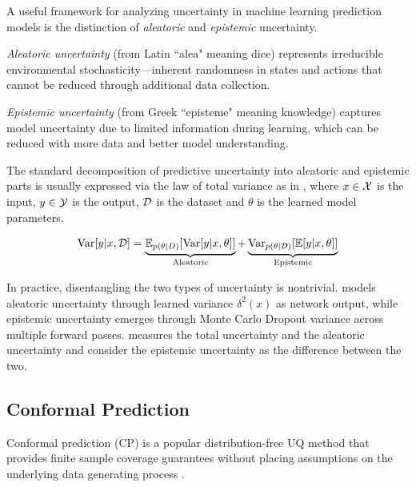 A useful framework for analyzing uncertainty in machine learning prediction models is the distinction of \textit{aleatoric} and \textit{epistemic} uncertainty.

\textit{Aleatoric uncertainty} (from Latin ``alea" meaning dice) represents irreducible environmental stochasticity—inherent randomness in states and actions that cannot be reduced through additional data collection.

\textit{Epistemic uncertainty} (from Greek ``episteme" meaning knowledge) captures model uncertainty due to limited information during learning, which can be reduced with more data and better model understanding.

The standard decomposition of predictive uncertainty into aleatoric and epistemic parts is usually expressed via the law of total variance as in  \cite{mackay2003information}, where $x\in {\mathcal{X}}$ is the input, $y\in {\mathcal{Y}}$ is the output, ${\mathcal{D}}$ is the dataset and $\theta$ is the learned model parameters.

\begin{equation}
\text{Var}[y|x, {\mathcal{D}}] = \underbrace{\mathbb{E}_{p(\theta|D)}[\text{Var}[y|x,\theta]]}_{\text{Aleatoric}} + \underbrace{\text{Var}_{p(\theta|{\mathcal{D}})}[\mathbb{E}[y|x,\theta]]}_{\text{Epistemic}}
\label{eq:aleatoric_epistemic_decomp}
\end{equation}



In practice, disentangling the two types of uncertainty is nontrivial. \cite{Gal2017uncertainty}  models aleatoric uncertainty through learned variance $\delta^2(x)$ as network output, while epistemic uncertainty emerges through Monte Carlo Dropout variance across multiple forward passes.
\cite{devries2018learning} measures the total uncertainty and the aleatoric uncertainty and consider the epistemic uncertainty as the difference between the two.

\subsection{Conformal Prediction}
 Conformal prediction (CP) is a popular distribution-free UQ method that provides finite sample coverage guarantees without placing assumptions on the underlying data generating process \cite{vovk2005algorithmic}.
